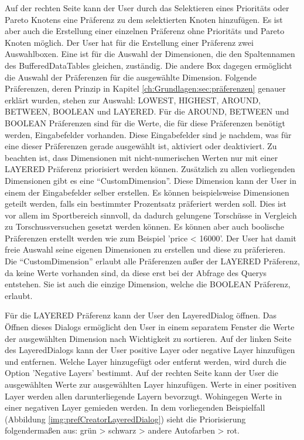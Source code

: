 Auf der rechten Seite kann der User durch das Selektieren eines Prioritäts oder Pareto Knotens eine Präferenz zu dem selektierten Knoten hinzufügen. Es ist aber auch die Erstellung einer einzelnen Präferenz ohne Prioritäts und Pareto Knoten möglich. Der User hat für die Erstellung einer Präferenz zwei Auswahlboxen. Eine ist für die Auswahl der Dimensionen, die den Spaltennamen des BufferedDataTables gleichen, zuständig. Die andere Box dagegen ermöglicht die Auswahl der Präferenzen für die ausgewählte Dimension. Folgende Präferenzen, deren Prinzip in Kapitel \ref{ch:Grundlagen:sec:präferenzen} genauer erklärt wurden, stehen zur Auswahl: LOWEST, HIGHEST, AROUND, BETWEEN, BOOLEAN und LAYERED. Für die AROUND, BETWEEN und BOOLEAN Präferenzen sind für die Werte, die für diese Präferenzen benötigt werden, Eingabefelder vorhanden. Diese Eingabefelder sind je nachdem, was für eine dieser Präferenzen gerade ausgewählt ist, aktiviert oder deaktiviert. Zu beachten ist, dass Dimensionen mit nicht-numerischen Werten nur mit einer LAYERED Präferenz priorisiert werden können. 
Zusätzlich zu allen vorliegenden Dimensionen gibt es eine \enquote{CustomDimension}. Diese Dimension kann der User in einem der Eingabefelder selber erstellen. Es können beispielsweise Dimensionen geteilt werden, falls ein bestimmter Prozentsatz präferiert werden soll. Dies ist vor allem im Sportbereich sinnvoll, da dadurch gelungene Torschüsse in Vergleich zu Torschussversuchen gesetzt werden können. Es können aber auch boolische Präferenzen erstellt werden wie zum Beispiel 'price < 16000'. Der User hat damit freie Auswahl seine eigenen Dimensionen zu erstellen und diese zu präferieren. Die \enquote{CustomDimension} erlaubt alle Präferenzen außer der LAYERED Präferenz, da keine Werte vorhanden sind, da diese erst bei der Abfrage des Querys entstehen. Sie ist auch die einzige Dimension, welche die BOOLEAN Präferenz, erlaubt. 

Für die LAYERED Präferenz kann der User den LayeredDialog öffnen. Das Öffnen dieses Dialogs ermöglicht den User in einem separatem Fenster die Werte der ausgewählten Dimension nach Wichtigkeit zu sortieren.
Auf der linken Seite des LayeredDialogs kann der User positive Layer oder negative Layer hinzufügen und entfernen. Welche Layer hinzugefügt oder entfernt werden, wird durch die Option 'Negative Layers' bestimmt. Auf der rechten Seite kann der User die ausgewählten Werte zur ausgewählten Layer hinzufügen. Werte in einer positiven Layer werden allen darunterliegende Layern bevorzugt. Wohingegen Werte in einer negativen Layer gemieden werden. In dem vorliegenden Beispielfall (Abbildung \ref{img:prefCreatorLayeredDialog}) sieht die Priorisierung folgendermaßen aus: grün > schwarz > andere Autofarben > rot. 

